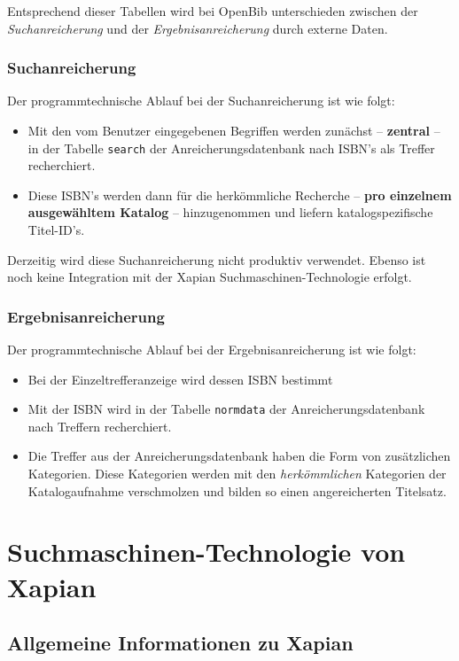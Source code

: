 \documentclass[11pt, twoside, a4paper, BCOR8mm, DIV12, bibtotoc,idxtotoc]{scrbook}
\begin{document}
Entsprechend dieser Tabellen wird bei OpenBib unterschieden zwischen
der \emph{Suchanreicherung} und der \emph{Ergebnisanreicherung}
durch externe Daten.

\subsubsection{Suchanreicherung}
Der programmtechnische Ablauf bei der Suchanreicherung ist wie folgt:

\begin{itemize}
\item Mit den vom Benutzer eingegebenen Begriffen werden zunächst --
  \textbf{zentral} -- in der Tabelle \texttt{search} der
  Anreicherungsdatenbank nach ISBN's als Treffer recherchiert.
\item Diese ISBN's werden dann für die herkömmliche Recherche --
  \textbf{pro einzelnem aus\-ge\-wähl\-tem Katalog} -- hinzugenommen und
  liefern katalogspezifische Titel-ID's.
\end{itemize}

Derzeitig wird diese Suchanreicherung nicht produktiv
verwendet. Ebenso ist noch keine Integration mit der Xapian
Suchmaschinen-Technologie erfolgt.

\subsubsection{Ergebnisanreicherung}
Der programmtechnische Ablauf bei der Ergebnisanreicherung ist wie folgt:

\begin{itemize}
\item Bei der Einzeltrefferanzeige wird dessen ISBN bestimmt
\item Mit der ISBN wird in der Tabelle \texttt{normdata} der
  Anreicherungs\-datenbank nach Treffern recherchiert.
\item Die Treffer aus der Anreicherungsdatenbank haben die Form von
  zusätzlichen Kategorien. Diese Kategorien werden mit den
  \emph{herkömmlichen} Kategorien der Katalogaufnahme ver\-schmol\-zen
  und bilden so einen angereicherten Titelsatz.
\end{itemize}

\section{Suchmaschinen-Technologie von Xapian}


\subsection{Allgemeine Informationen zu Xapian}
\end{document}
